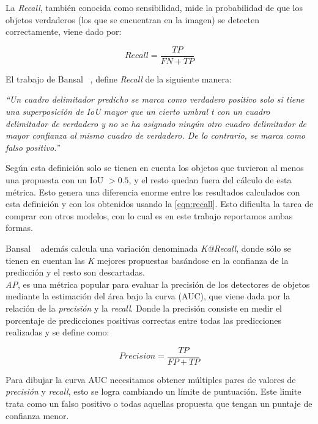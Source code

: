 La \textit{Recall}, también conocida como sensibilidad, mide la probabilidad de que los objetos verdaderos (los que se encuentran en la imagen) se detecten correctamente, viene dado por: 

\begin{equation}
	\label{eqn:recall}
	Recall =\frac{TP}{FN+TP}
\end{equation}

El trabajo de Bansal \etal~\cite{bansal2018zero}, define \textit{Recall} de la siguiente manera: 
\begin{center}
	\textit{``Un cuadro delimitador predicho se marca como verdadero positivo solo si tiene una superposición de IoU mayor que un cierto umbral t con un cuadro delimitador de verdadero y no se ha asignado ningún otro cuadro delimitador de mayor confianza al mismo cuadro de verdadero. De lo contrario, se marca como falso positivo.''}\\
\end{center}

Según esta definición solo se tienen en cuenta los objetos que tuvieron al menos una propuesta con un IoU $> 0.5$, y el resto quedan fuera del cálculo de esta métrica. Esto genera una diferencia enorme entre los resultados calculados con esta definición y con los obtenidos usando la \autoref{eqn:recall}. Esto dificulta la tarea de comprar con otros modelos, con lo cual es en este trabajo reportamos ambas formas. 

Bansal \etal~\cite{bansal2018zero} además calcula una variación denominada \textit{K@Recall}, donde sólo se tienen en cuentan las \textit{K} mejores propuestas basándose en la confianza de la predicción y el resto son descartadas.\\


\textit{AP}, es una métrica popular para evaluar la precisión de los detectores de objetos mediante la estimación del área bajo la curva (AUC), que viene dada por la relación de la \textit{precisión} y la \textit{recall}. Donde la precisión consiste en medir el porcentaje de predicciones positivas correctas entre todas las predicciones realizadas y se define como:

\begin{equation} 
\label{eqn:precision}
Precision =\frac{TP}{FP+TP}
\end{equation}


Para dibujar la curva AUC necesitamos obtener múltiples pares de valores de \textit{precisión} y \textit{recall}, esto se logra cambiando un límite de puntuación. Este limite trata como un falso positivo o todas aquellas propuesta que tengan un puntaje de confianza menor.

